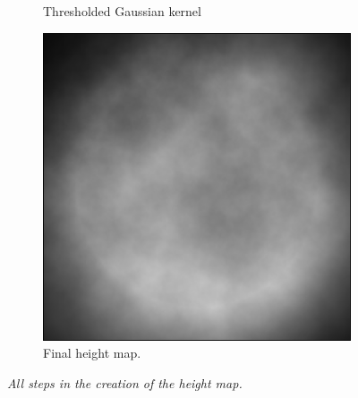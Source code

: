 \begin{figure}[H]
\begin{subfigure}{\textwidth/3}
  \caption{Thresholded Gaussian kernel}
  \label{fig:heightMapKernel}
\end{subfigure}
\begin{subfigure}{\textwidth/3}
  \centering
  \includegraphics[width=0.9\linewidth]{images/heightMapFinal.jpg}
  \caption{Final height map.}
  \label{fig:heightMapFinal}
\end{subfigure}
\caption[Height map construction]{\textit{All steps in the creation of the height map.}}
\label{fig:heightMapConstruction}
\end{figure}


